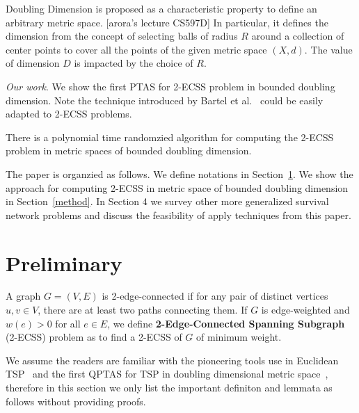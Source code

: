 \documentclass{llncs}
\begin{document}
Doubling Dimension is proposed as a characteristic property to define an arbitrary metric space. [arora's lecture CS597D]
In particular, it defines the dimension from the concept of selecting balls of radius $R$ around a collection of center points to cover all the points of the given metric space $(X,d)$.
The value of dimension $D$ is impacted by the choice of $R$.


\emph{Our work}. We show the first PTAS for 2-ECSS problem in bounded doubling dimension.
Note the technique introduced by Bartel {et al.}~\cite{Bartal12} could be easily adapted to 2-ECSS problems.

\begin{theorem}
There is a polynomial time randomzied algorithm for computing the 2-ECSS problem in metric spaces of bounded doubling dimension. 
\end{theorem}

The paper is organzied as follows.
We define notations in Section~\ref{prelim}.
We show the approach for computing 2-ECSS in metric space of bounded doubling dimension in Section~\ref{method}.
In Section 4 we survey other more generalized survival network problems and discuss the feasibility of apply techniques from this paper.


\section{Preliminary}
\label{prelim}

A graph $G=(V,E)$ is 2-edge-connected if for any pair of distinct vertices $u,v\in V$, there are at least two paths connecting them.
If $G$ is edge-weighted and $w(e)>0$ for all $e\in E$, we define \textbf{2-Edge-Connected Spanning Subgraph} (2-ECSS) problem as to find a 2-ECSS of $G$ of minimum weight.

We assume the readers are familiar with the pioneering tools use in Euclidean TSP~\cite{Arora98} and the first QPTAS for TSP in doubling dimensional metric space~\cite{Talwar04}, therefore in this section we only list the important definiton and lemmata as follows without providing proofs.
\end{document}
